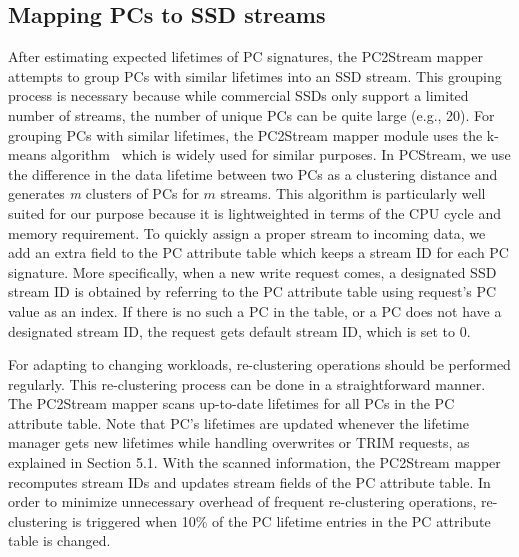 \vspace{-10pt}
\subsection{Mapping PCs to SSD streams}
\vspace{-5pt}

After estimating expected lifetimes of PC signatures, the PC2Stream mapper 
attempts to group PCs with similar lifetimes into an SSD stream.  This grouping
process is necessary because while commercial SSDs only support a limited number
of streams, the number of unique PCs can be quite large (e.g., 20).  
For grouping PCs with similar lifetimes, the PC2Stream mapper module uses the k-means
algorithm~\cite{kmeans} which is widely used for similar purposes.  
{\color{blue}
In \textsf{\small PCStream}, we use the difference in the data lifetime between two PCs 
as a clustering distance and  generates {\it m} clusters of PCs for $m$ streams.
This algorithm is particularly well suited for our purpose because 
it is lightweighted in terms of the CPU cycle and memory requirement.
}
To quickly assign a proper stream to incoming data, we add an extra field to the
PC attribute table which keeps a stream ID for each PC signature.  More
specifically, when a new write request comes, a designated SSD stream ID is
obtained by referring to the PC attribute table using request's PC value as an
index.  If there is no such a PC in the table, or a PC does not have a
designated stream ID, the request gets default stream ID, which is set to 0.

For adapting to changing workloads, re-clustering operations should be
performed regularly. This re-clustering process can be done in a
straightforward manner. The PC2Stream mapper scans up-to-date lifetimes for
all PCs in the PC attribute table. Note that PC's lifetimes are updated whenever
the lifetime manager gets new lifetimes while handling overwrites or TRIM requests,
as explained in Section 5.1.  With the scanned information, the PC2Stream mapper
recomputes stream IDs and updates stream fields of the PC attribute table.
In order to minimize unnecessary overhead of frequent re-clustering operations, 
re-clustering is triggered when 10\% of the PC lifetime entries in the PC attribute
table is changed.


\vspace{-10pt}
